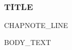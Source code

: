 %
%

\begin{frame}
  \frametitle{{{TITLE}}}
  {{CHAPNOTE_LINE}}
  \vskip0.2cm

  {{BODY_TEXT}}

  \vskip0.3cm

\end{frame}

%
